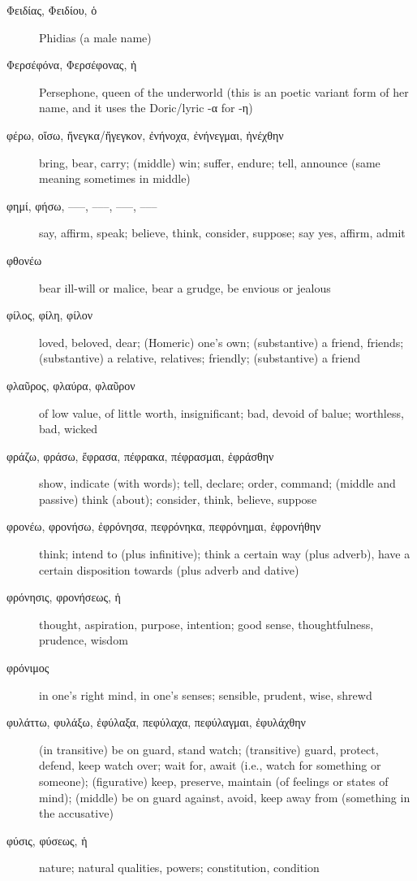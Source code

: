 \documentclass[12pt,letterpaper]{article}
\begin{document}
\begin{description}
    \item[\textgreek{Φειδίας, Φειδίου, ὁ}] Phidias (a male name)
    \item[\textgreek{Φερσέφόνα, Φερσέφονας, ἡ}] Persephone, queen of the underworld (this is an poetic variant form of her name, and it uses the Doric/lyric -\textgreek{α} for -\textgreek{η})
    \item[\textgreek{φέρω, οἴσω, ἤνεγκα/ἤγεγκον, ἐνήνοχα, ἐνήνεγμαι, ἠνέχθην}] \marginnote{*}bring, bear, carry; (middle) win; suffer, endure; tell, announce (same meaning sometimes in middle)
    \item[\textgreek{φημί, φήσω, –––, –––, –––, –––}] \marginnote{*}say, affirm, speak; believe, think, consider, suppose; say yes, affirm, admit
    \item[\textgreek{φθονέω}] bear ill-will or malice, bear a grudge, be envious or jealous
    \item[\textgreek{φίλος, φίλη, φίλον}] \marginnote{*}loved, beloved, dear; (Homeric) one's own; (substantive) a friend, friends; (substantive) a relative, relatives; friendly; (substantive) a friend
    \item[\textgreek{φλαῦρος, φλαύρα, φλαῦρον}] of low value, of little worth, insignificant; bad, devoid of balue; worthless, bad, wicked
    \item[\textgreek{φράζω, φράσω, ἔφρασα, πέφρακα, πέφρασμαι, ἐφράσθην}] \marginnote{*}show, indicate (with words); tell, declare; order, command; (middle and passive) think (about); consider, think, believe, suppose
    \item[\textgreek{φρονέω, φρονήσω, ἐφρόνησα, πεφρόνηκα, πεφρόνημαι, ἐφρονήθην}] \marginnote{*}think; intend to (plus infinitive); think a certain way (plus adverb), have a certain disposition towards (plus adverb and dative)
    \item[\textgreek{φρόνησις, φρονήσεως, ἡ}] thought, aspiration, purpose, intention; good sense, thoughtfulness, prudence, wisdom
    \item[\textgreek{φρόνιμος}] in one's right mind, in one's senses; sensible, prudent, wise, shrewd
    \item[\textgreek{φυλάττω, φυλάξω, ἐφύλαξα, πεφύλαχα, πεφύλαγμαι, ἐφυλάχθην}] \marginnote{*}(in transitive) be on guard, stand watch; (transitive) guard, protect, defend, keep watch over; wait for, await (i.e., watch for something or someone); (figurative) keep, preserve, maintain (of feelings or states of mind); (middle) be on guard against, avoid, keep away from (something in the accusative)
    \item[\textgreek{φύσις, φύσεως, ἡ}] \marginnote{*}nature; natural qualities, powers; constitution, condition

\end{description}
\end{document}
